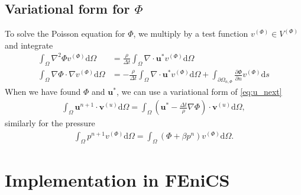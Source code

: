 \documentclass[a4paper,10pt]{article}
\renewcommand{\vec}[1]{\mathbf{#1}}
\renewcommand{\(}{\left(}
\renewcommand{\)}{\right)}
\newcommand{\dm}[1]{\text{d}#1}
\newcommand{\dpart}[2]{\frac{\partial#1}{\partial#2}}
\begin{document}
\subsection{Variational form for $\Phi$}
To solve the Poisson equation for $\Phi$, we multiply by a test function $v^{(\Phi)} \in V^{(\Phi)}$ and integrate
\begin{align*}
  \int_\Omega \nabla^2\Phi v^{(\Phi)} \dm \Omega &= \frac{\rho}{\Delta t} \int_\Omega \nabla \cdot \vec u^* v^{(\Phi)} \dm \Omega\\
  \int_\Omega \nabla\Phi \cdot \nabla v^{(\Phi)} \dm \Omega &= -\frac{\rho}{\Delta t} \int_\Omega \nabla \cdot \vec u^* v^{(\Phi)} \dm \Omega + \int_{\partial \Omega_{n,\Phi}} \dpart{\Phi}{n}v^{(\Phi)} \dm s
\end{align*}
When we have found $\Phi$ and $\vec u^*$, we can use a variational form of \eqref{eq:u_next}
\begin{align*}
  \int_\Omega \vec u^{n+1}\cdot \vec v^{(u)} \dm \Omega = \int_\Omega (\vec u^* - \frac{\Delta t}{\rho}\nabla \Phi)\cdot \vec v^{(u)} \dm \Omega,
\end{align*}
similarly for the pressure
\begin{align*}
  \int_\Omega p^{n+1}v^{(\Phi)} \dm \Omega = \int_\Omega (\Phi + \beta p^n)v^{(\Phi)} \dm \Omega.
\end{align*}
\section{Implementation in FEniCS}
\end{document}
